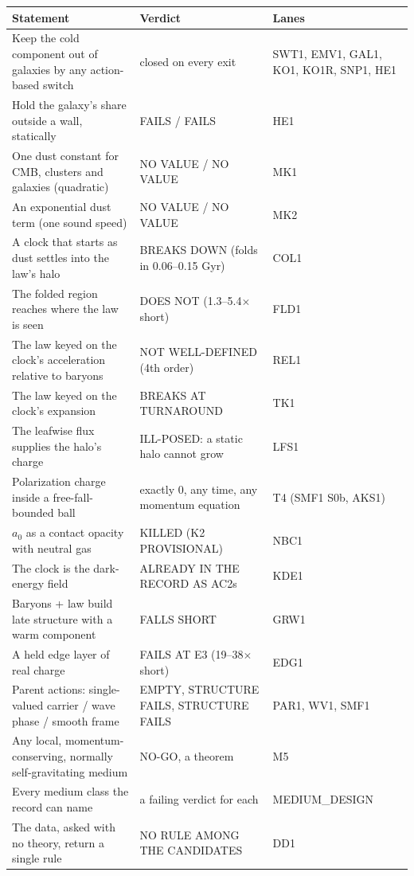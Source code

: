 \documentclass[10pt]{article}
\begin{document}
{\small
\begin{longtable}{@{}p{}p{}p{}@{}}
\toprule
Statement & Verdict & Lanes\\\midrule
\endhead
Keep the cold component out of galaxies by any action-based switch & closed on every exit & SWT1, EMV1, GAL1, KO1, KO1R, SNP1, HE1\\
Hold the galaxy's share outside a wall, statically & FAILS / FAILS & HE1\\
One dust constant for CMB, clusters and galaxies (quadratic) & NO VALUE / NO VALUE & MK1\\
An exponential dust term (one sound speed) & NO VALUE / NO VALUE & MK2\\
A clock that starts as dust settles into the law's halo & BREAKS DOWN (folds in 0.06--0.15 Gyr) & COL1\\
The folded region reaches where the law is seen & DOES NOT (1.3--5.4$\times$ short) & FLD1\\
The law keyed on the clock's acceleration relative to baryons & NOT WELL-DEFINED (4th order) & REL1\\
The law keyed on the clock's expansion & BREAKS AT TURNAROUND & TK1\\
The leafwise flux supplies the halo's charge & ILL-POSED: a static halo cannot grow & LFS1\\
Polarization charge inside a free-fall-bounded ball & exactly 0, any time, any momentum equation & T4 (SMF1 S0b, AKS1)\\
$a_0$ as a contact opacity with neutral gas & KILLED (K2 PROVISIONAL) & NBC1\\
The clock is the dark-energy field & ALREADY IN THE RECORD AS AC2s & KDE1\\
Baryons + law build late structure with a warm component & FALLS SHORT & GRW1\\
A held edge layer of real charge & FAILS AT E3 (19--38$\times$ short) & EDG1\\
Parent actions: single-valued carrier / wave phase / smooth frame & EMPTY, STRUCTURE FAILS, STRUCTURE FAILS & PAR1, WV1, SMF1\\
Any local, momentum-conserving, normally self-gravitating medium & NO-GO, a theorem & M5\\
Every medium class the record can name & a failing verdict for each & MEDIUM\_DESIGN\\
The data, asked with no theory, return a single rule & NO RULE AMONG THE CANDIDATES & DD1\\
\bottomrule
\end{longtable}}
\end{document}
